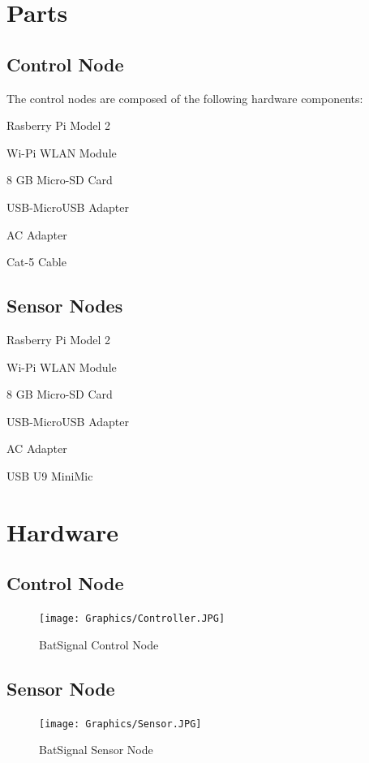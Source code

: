 \documentclass[11pt,a4paper]{article}
\begin{document}
\section{Parts}
\subsection{Control Node}
The control nodes are composed of the following hardware components:
\begin{list}{-}{}
	\item{Rasberry Pi Model 2}
	\item{Wi-Pi WLAN Module}
	\item{8 GB Micro-SD Card}
	\item{USB-MicroUSB Adapter}
	\item{AC Adapter}
	\item{Cat-5 Cable}
\end{list}

\subsection{Sensor Nodes}
\begin{list}{-}{}
	\item{Rasberry Pi Model 2}
	\item{Wi-Pi WLAN Module}
	\item{8 GB Micro-SD Card}
	\item{USB-MicroUSB Adapter}
	\item{AC Adapter}
	\item{USB U9 MiniMic}
\end{list}

\section{Hardware}
\subsection{Control Node}
\begin{figure}[H]
	\centering
		\texttt{[image: Graphics/Controller.JPG]}
	\caption{BatSignal Control Node}
\end{figure}

\subsection{Sensor Node}
\begin{figure}[H]
	\centering
		\texttt{[image: Graphics/Sensor.JPG]}
	\caption{BatSignal Sensor Node}
\end{figure}
\end{document}
